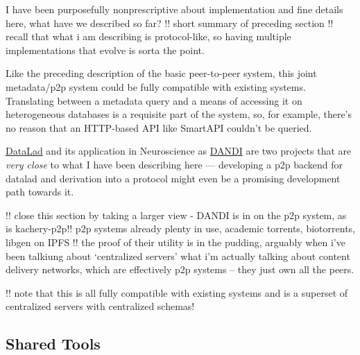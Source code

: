\documentclass[10pt]{article}
\begin{document}
\begin{multicols}{2}
I have been purposefully nonprescriptive about implementation and fine
details here, what have we described so far? !! short summary of
preceding section !! recall that what i am describing is protocol-like,
so having multiple implementations that evolve is sorta the point.

Like the preceding description of the basic peer-to-peer system, this
joint metadata/p2p system could be fully compatible with existing
systems. Translating between a metadata query and a means of accessing
it on heterogeneous databases is a requisite part of the system, so, for
example, there's no reason that an HTTP-based API like SmartAPI couldn't
be queried.

\href{https://www.datalad.org/}{DataLad} \cite{halchenkoDataLadDistributedSystem2021, hankeDefenseDecentralizedResearch2021}  and its application in
Neuroscience as \href{https://dandiarchive.org}{DANDI} are two projects
that are \emph{very close} to what I have been describing here ---
developing a p2p backend for datalad and derivation into a protocol
might even be a promising development path towards it.

!! close this section by taking a larger view - \cite{langilleBioTorrentsFileSharing2010}  DANDI is in on the p2p system,
as is kachery-p2p!! p2p systems already plenty in use, academic
torrents, biotorrents, libgen on IPFS !! the proof of their utility is
in the pudding, arguably when i've been talkiung about `centralized
servers' what i'm actually talking about content delivery networks,
which are effectively p2p systems -- they just own all the peers.

!! note that this is all fully compatible with existing systems and is a
superset of centralized servers with centralized schemas! 
\end{multicols}


\hypertarget{shared-tools}{%
\subsection{Shared Tools}\label{shared-tools}}
\end{document}

